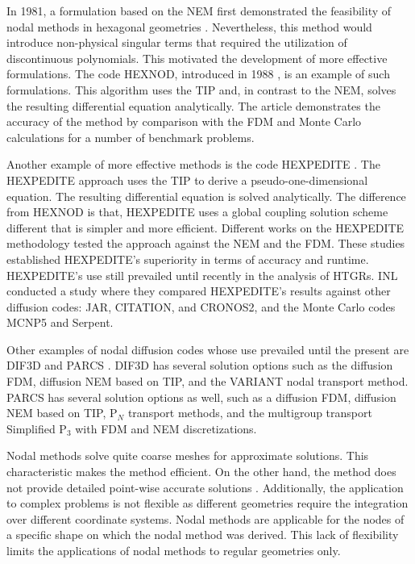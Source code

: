 \documentclass[11pt,letterpaper]{article}
\begin{document}
In 1981, a formulation based on the \gls{NEM} first demonstrated the feasibility of nodal methods in hexagonal geometries \cite{duracz_nodal_1981}.
Nevertheless, this method would introduce non-physical singular terms that required the utilization of discontinuous polynomials.
This motivated the development of more effective formulations.
The code HEXNOD, introduced in 1988 \cite{wagner_three-dimensional_1989}, is an example of such formulations.
This algorithm uses the \gls{TIP} and, in contrast to the \gls{NEM}, solves the resulting differential equation analytically.
The article demonstrates the accuracy of the method by comparison with the \gls{FDM} and Monte Carlo calculations for a number of benchmark problems.

Another example of more effective methods is the code HEXPEDITE \cite{fitzpatrick_hexpedite_1992}.
The HEXPEDITE approach uses the \gls{TIP} to derive a pseudo-one-dimensional equation.
The resulting differential equation is solved analytically.
The difference from HEXNOD is that, HEXPEDITE uses a global coupling solution scheme different that is simpler and more efficient.
Different works \cite{fitzpatrick_hexpedite_1992}\cite{fitzpatrick_developments_1995} on the HEXPEDITE methodology tested the approach against the \gls{NEM} and the \gls{FDM}.
These studies established HEXPEDITE’s superiority in terms of accuracy and runtime.
HEXPEDITE's use still prevailed until recently in the analysis of \glspl{HTGR}.
INL conducted a study \cite{ortensi_deterministic_2010-1} where they compared HEXPEDITE's results against other diffusion codes: JAR, CITATION, and CRONOS2, and the Monte Carlo codes MCNP5 and Serpent.

Other examples of nodal diffusion codes whose use prevailed until the present are DIF3D \cite{lawrence_dif3d_1983} and PARCS \cite{downar_parcs_2004}.
DIF3D has several solution options such as the diffusion \gls{FDM}, diffusion \gls{NEM} based on \gls{TIP}, and the VARIANT nodal transport method.
PARCS has several solution options as well, such as a diffusion \gls{FDM}, diffusion \gls{NEM} based on \gls{TIP}, P$_{N}$ transport methods, and the multigroup transport Simplified P$_3$ with \gls{FDM} and \gls{NEM} discretizations.

Nodal methods solve quite coarse meshes for approximate solutions.
This characteristic makes the method efficient.
On the other hand, the method does not provide detailed point-wise accurate solutions \cite{kang_finite_1973}.
Additionally, the application to complex problems is not flexible as different geometries require the integration over different coordinate systems.
Nodal methods are applicable for the nodes of a specific shape on which the nodal method was derived.
This lack of flexibility limits the applications of nodal methods to regular geometries only.
\end{document}
